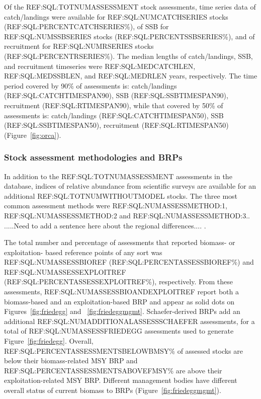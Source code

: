 Of the REF:SQL:TOTNUMASSESSMENT stock assessments, time series data of
catch/landings were available for REF:SQL:NUMCATCHSERIES stocks (REF:SQL:PERCENTCATCHSERIES\%),
of SSB for REF:SQL:NUMSSBSERIES stocks (REF:SQL:PERCENTSSBSERIES\%), and of recruitment for
REF:SQL:NUMRSERIES stocks (REF:SQL:PERCENTRSERIES\%).  The median lengths of
catch/landings, SSB, and recruitment timeseries were
REF:SQL:MEDCATCHLEN, REF:SQL:MEDSSBLEN, and REF:SQL:MEDRLEN years,
respectively.  The time period covered by 90\%
of assessments is: catch/landings (REF:SQL:CATCHTIMESPAN90), SSB (REF:SQL:SSBTIMESPAN90), recruitment
(REF:SQL:RTIMESPAN90), while that covered by 50\% of assessments is: catch/landings
(REF:SQL:CATCHTIMESPAN50), SSB (REF:SQL:SSBTIMESPAN50), recruitment (REF:SQL:RTIMESPAN50) (Figure~\ref{fig:orca}).

\subsubsection*{Stock assessment methodologies and BRPs}
In addition to the REF:SQL:TOTNUMASSESSMENT assessments in the
database, indices of relative abundance from scientific surveys are
available for an additional REF:SQL:TOTNUMWITHOUTMODEL stocks. The
three most common assessment methods were REF:SQL:NUMASSESSMETHOD:1,
REF:SQL:NUMASSESSMETHOD:2 and REF:SQL:NUMASSESSMETHOD:3..  .....Need
to add a sentence here about the regional differences.... .


The total number and percentage of assessments that reported biomass-
or exploitation- based reference points of any sort was
REF:SQL:NUMASSESSBIOREF (REF:SQL:PERCENTASSESSBIOREF\%) and
REF:SQL:NUMASSESSEXPLOITREF (REF:SQL:PERCENTASSESSEXPLOITREF\%),
respectively. From these assessments,
REF:SQL:NUMASSESSBIOANDEXPLOITREF report both a biomass-based and an
exploitation-based BRP and appear as solid dots on
Figures~\ref{fig:friedegg} and ~\ref{fig:friedeggmgmt}. Schaefer-derived BRPs
add an additional REF:SQL:NUMADDITIONALASSESSSCHAEFER assessments, for
a total of REF:SQL:NUMASSESSFRIEDEGG assessments used to generate
Figure~\ref{fig:friedegg}. Overall,
REF:SQL:PERCENTASSESSMENTSBELOWBMSY\% of assessed stocks are below
their biomass-related MSY BRP and
REF:SQL:PERCENTASSESSMENTSABOVEFMSY\% are above their
exploitation-related MSY BRP. Different management bodies have
different overall status of current biomass to BRPs
(Figure~\ref{fig:friedeggmgmt}).
 
